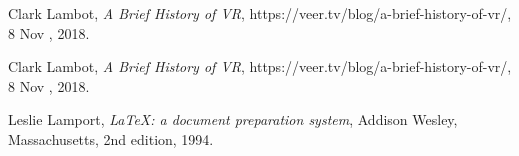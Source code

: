 \documentclass[]{report}
\begin{document}
\begin{thebibliography}{9}
	
	Clark Lambot,
	\textit{A Brief History of VR},
	https://veer.tv/blog/a-brief-history-of-vr/,
	8 Nov , 2018.
	
	Clark Lambot,
	\textit{A Brief History of VR},
	https://veer.tv/blog/a-brief-history-of-vr/,
	8 Nov , 2018.
	
	Leslie Lamport,
	\textit{\LaTeX: a document preparation system},
	Addison Wesley, Massachusetts,
	2nd edition,
	1994.
	
\end{thebibliography}
\end{document}
